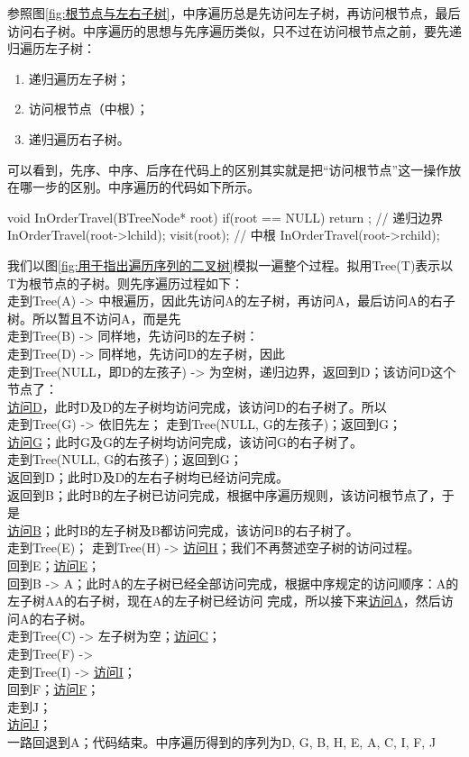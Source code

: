 参照图\ref{fig:根节点与左右子树}，中序遍历总是先访问左子树，再访问根节点，最后访问右子树。中序遍历的思想与先序遍历类似，只不过在访问根节点之前，要先递归遍历左子树：
\begin{enumerate}
    \item 递归遍历左子树；
    \item 访问根节点（中根）；
    \item 递归遍历右子树。
\end{enumerate}
可以看到，先序、中序、后序在代码上的区别其实就是把“访问根节点”这一操作放在哪一步的区别。中序遍历的代码如下所示。
\begin{cppcode}
    void InOrderTravel(BTreeNode* root) {
        if(root == NULL) return ;   // 递归边界
        InOrderTravel(root->lchild);   
        visit(root);        // 中根
        InOrderTravel(root->rchild);   
    }
\end{cppcode}
我们以图\ref{fig:用于指出遍历序列的二叉树}模拟一遍整个过程。拟用Tree(T)表示以T为根节点的子树。则先序遍历过程如下：\\[0.5em]
走到Tree(A) -> 中根遍历，因此先访问A的左子树，再访问A，最后访问A的右子树。所以暂且不访问A，而是先\\[0.5em]
走到Tree(B) -> 同样地，先访问B的左子树：\\[0.5em]
走到Tree(D) -> 同样地，先访问D的左子树，因此\\[0.5em]
走到Tree(NULL，即D的左孩子) -> 为空树，递归边界，返回到D；该访问D这个节点了：\\[0.5em]
\uline{访问D}，此时D及D的左子树均访问完成，该访问D的右子树了。所以\\[0.5em]
走到Tree(G) -> 依旧先左；
走到Tree(NULL, G的左孩子)；返回到G；\\[0.5em]
\uline{访问G}；此时G及G的左子树均访问完成，该访问G的右子树了。\\[0.5em]
走到Tree(NULL, G的右孩子)；返回到G；\\[0.5em]
返回到D；此时D及D的左右子树均已经访问完成。\\[0.5em]
返回到B；此时B的左子树已访问完成，根据中序遍历规则，该访问根节点了，于是\\[0.5em]
\uline{访问B}；此时B的左子树及B都访问完成，该访问B的右子树了。\\[0.5em]
走到Tree(E)；
走到Tree(H) -> \uline{访问H}；我们不再赘述空子树的访问过程。\\[0.5em]
回到E；\uline{访问E}；\\[0.5em]
回到B -> A；此时A的左子树已经全部访问完成，根据中序规定的访问顺序：A的左子树\;A\;A的右子树，现在A的左子树已经访问
完成，所以接下来\uline{访问A}，然后访问A的右子树。\\[0.5em]
走到Tree(C) -> 左子树为空；\uline{访问C}；\\[0.5em]
走到Tree(F) -> \\[0.5em]
走到Tree(I) -> \uline{访问I}；\\[0.5em]
回到F；\uline{访问F}；\\[0.5em]
走到J；\\[0.5em]
\uline{访问J}；\\[0.5em]
一路回退到A；代码结束。中序遍历得到的序列为D, G, B, H, E, A, C, I, F, J\\

